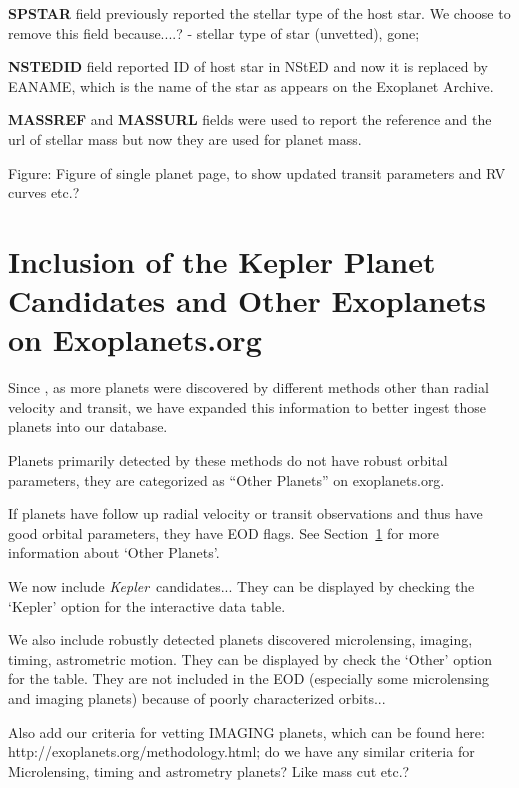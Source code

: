 \documentclass[11pt,preprint]{aastex}
\def\kepler{\textit{Kepler}}
\begin{document}
\begin{CJK*}{UTF8}{gbsn}
{\bf SPSTAR} field previously reported the stellar type of the host
star. We choose to remove this field because....? - stellar type of
star (unvetted), gone;

{\bf NSTEDID} field reported ID of host star in NStED and now it is
replaced by EANAME, which is the name of the star as appears on the
Exoplanet Archive.

{\bf MASSREF} and {\bf MASSURL} fields were used to report the
reference and the url of stellar mass but now they are used for planet
mass.

Figure: Figure of single planet page, to show updated transit
parameters and RV curves etc.?


\section{Inclusion of the Kepler Planet Candidates and Other Exoplanets on Exoplanets.org}\label{sec:kepler}

Since \cite{Wright2011}, as more planets were discovered by different
methods other than radial velocity and transit, we have expanded this
information to better ingest those planets into our database.

Planets primarily detected by these methods do not have robust orbital
parameters, they are categorized as ``Other Planets'' on
exoplanets.org.

If planets have follow up radial velocity or transit observations and
thus have good orbital parameters, they have EOD flags. See
Section~\ref{sec:kepler} for more information about `Other Planets'.


We now include \kepler\ candidates... They can be displayed by
checking the `Kepler' option for the interactive data table.

We also include robustly detected planets discovered microlensing,
imaging, timing, astrometric motion. They can be displayed by check
the `Other' option for the table. They are not included in the EOD
(especially some microlensing and imaging planets) because of poorly
characterized orbits...

Also add our criteria for vetting IMAGING planets, which can be found
here: http://exoplanets.org/methodology.html; do we have any similar
criteria for Microlensing, timing and astrometry planets? Like mass
cut etc.?


\end{CJK*}
\end{document}
